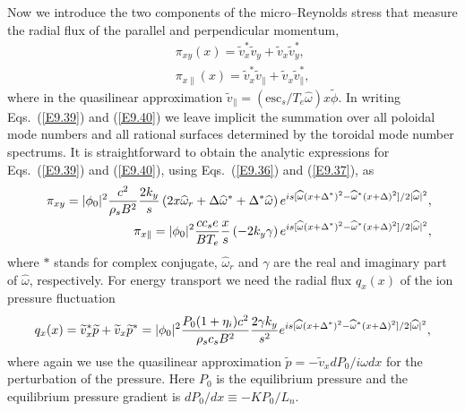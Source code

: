 \documentclass[a4paper,openany,12pt]{book}
\begin{document}
{Now we introduce the two components of the micro--Reynolds stress that measure the radial flux of the parallel and perpendicular momentum,
\begin{eqnarray}
&&\pi_{xy}(x)=\widetilde v_x^*\widetilde v_y+\widetilde v_x\widetilde v_y^*,\label{E9.39}\\
&&\pi_{x\|}(x)=\widetilde v_x^*\widetilde v_\|+\widetilde v_x\widetilde v_\|^*, \label{E9.40}
\end{eqnarray}
where in the quasilinear approximation $\widetilde v_\|=(\mbox{esc}_s/T_e\widehat\omega)x\widetilde\phi$. In writing Eqs.~(\ref{E9.39}) and (\ref{E9.40}) we leave implicit the summation over all poloidal mode numbers and all rational surfaces determined by the toroidal mode number spectrums. It is straightforward to obtain the analytic expressions for Eqs.~(\ref{E9.39}) and (\ref{E9.40}), using Eqs.~(\ref{E9.36}) and (\ref{E9.37}), as
\begin{eqnarray}
&&\pi_{xy}=|\phi_0|^2{c^2\over\rho_sB^2}{2k_y\over s}\left(2x\widehat\omega_r+\Delta\widehat\omega^*+\Delta^*\widehat\omega\right)e^{is[\widehat\omega(x+\Delta^*)^2-\widehat\omega^*(x+\Delta)^2]/2|\widehat\omega|^2},\label{E9.41}\\
&&\pi_{x\|}=|\phi_0|^2{cc_se\over BT_e}{x\over s}\left(-2k_y\gamma\right)
e^{is[\widehat\omega(x+\Delta^*)^2-\widehat\omega^*(x+\Delta)^2]/2|\widehat\omega|^2},\label{E9.42}
\end{eqnarray}
where $*$ stands for complex conjugate, $\widehat\omega_r$ and $\gamma$ are the real and imaginary part of $\widehat\omega$, respectively. For energy transport we need the radial flux $q_x(x)$ of the ion pressure fluctuation
\begin{equation}
q_x(x)=\widetilde v^*_x\widetilde p+\widetilde v_x\widetilde p^*=|\phi_0|^2
{P_0(1+\eta_i)c^2\over\rho_s c_s B^2}{2\gamma k_y\over s^2} e^{is[\widehat\omega
(x+\Delta^*)^2-\widehat\omega^*(x+\Delta)^2]/2|\widehat\omega|^2},\label{E9.43}
\end{equation}
where again we use the quasilinear approximation $\widetilde p=-\widetilde v_x
dP_0/i\omega dx$ for the perturbation of the pressure. Here $P_0$ is the equilibrium pressure and the equilibrium pressure gradient is $dP_0/dx\equiv -KP_0/L_n$.

}
\end{document}
